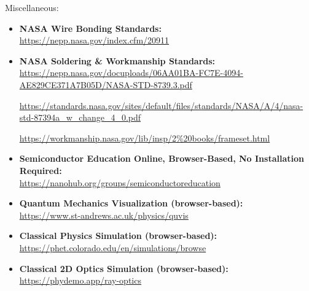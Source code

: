 \begin{flushleft}
\large Miscellaneous:
\end{flushleft}

\normalsize\begin{itemize}

  \item\textbf{NASA Wire Bonding Standards:}\\
\url{https://nepp.nasa.gov/index.cfm/20911}

  \item\textbf{NASA Soldering \& Workmanship Standards:}\\
\url{https://nepp.nasa.gov/docuploads/06AA01BA-FC7E-4094-AE829CE371A7B05D/NASA-STD-8739.3.pdf}

\url{https://standards.nasa.gov/sites/default/files/standards/NASA/A/4/nasa-std-87394a_w_change_4_0.pdf}

\url{https://workmanship.nasa.gov/lib/insp/2%20books/frameset.html}

  \item\textbf{Semiconductor Education Online, Browser-Based, No Installation Required:}\\
\url{https://nanohub.org/groups/semiconductoreducation}

  \item\textbf{Quantum Mechanics Visualization (browser-based):}\\
\url{https://www.st-andrews.ac.uk/physics/quvis}

  \item\textbf{Classical Physics Simulation (browser-based):}\\
\url{https://phet.colorado.edu/en/simulations/browse}

  \item\textbf{Classical 2D Optics Simulation (browser-based):}\\
\url{https://phydemo.app/ray-optics}


\end{itemize}
